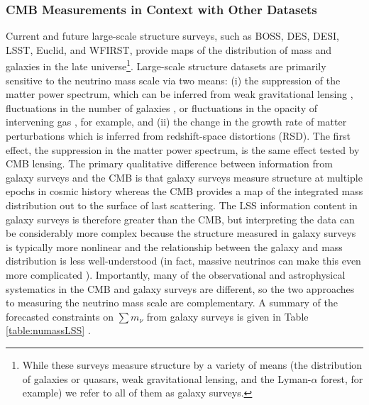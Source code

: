 \subsubsection{CMB Measurements in Context with Other Datasets}
Current and future large-scale structure surveys, such as BOSS, DES, DESI, LSST, Euclid, and WFIRST, provide maps of the distribution of mass and galaxies in the late universe\footnote{While these surveys measure structure by a variety of means (the distribution of galaxies or quasars, weak gravitational lensing, and the Lyman-$\alpha$ forest, for example) we refer to all of them as galaxy surveys.}. Large-scale structure datasets are primarily sensitive to the neutrino mass scale via two means: (i) the suppression of the matter power spectrum, which can be inferred from weak gravitational lensing \cite{Tereno:2008mm}, fluctuations in the number of galaxies \cite{Xia:2012na, Cuesta:2015iho}, or fluctuations in the opacity of intervening gas \cite{Palanque-Delabrouille:2014jca}, for example, and (ii) the change in the growth rate of matter perturbations which is inferred from redshift-space distortions (RSD)\cite{Beutler:2014yhv}. The first effect, the suppression in the matter power spectrum, is the same effect tested by CMB lensing.  The primary qualitative difference between information from galaxy surveys and the CMB is that galaxy surveys measure structure at multiple epochs in cosmic history whereas the CMB provides a map of the integrated mass distribution out to the surface of last scattering. The LSS information content in galaxy surveys is therefore greater than the CMB, but interpreting the data can be considerably more complex because the structure measured in galaxy surveys is typically more nonlinear and the relationship between the galaxy and mass distribution is less well-understood (in fact, massive neutrinos can make this even more complicated \cite{LoVerde:2014pxa}). Importantly, many of the observational and astrophysical systematics in the CMB and galaxy surveys are different, so the two approaches to measuring the neutrino mass scale are complementary. A summary of the forecasted constraints on $\sum m_\nu$ from galaxy surveys is given in Table \ref{table:numassLSS} \cite{Font-Ribera:2013rwa}. 
